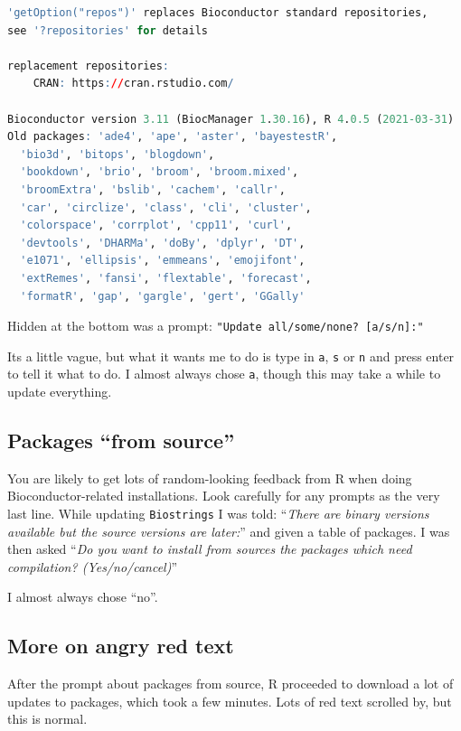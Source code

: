 \documentclass[
]{book}
\newcommand{\passthrough}[1]{#1}
\begin{document}
\begin{lstlisting}[language=R]
'getOption("repos")' replaces Bioconductor standard repositories, 
see '?repositories' for details

replacement repositories:
    CRAN: https://cran.rstudio.com/

Bioconductor version 3.11 (BiocManager 1.30.16), R 4.0.5 (2021-03-31)
Old packages: 'ade4', 'ape', 'aster', 'bayestestR', 
  'bio3d', 'bitops', 'blogdown',
  'bookdown', 'brio', 'broom', 'broom.mixed', 
  'broomExtra', 'bslib', 'cachem', 'callr',
  'car', 'circlize', 'class', 'cli', 'cluster', 
  'colorspace', 'corrplot', 'cpp11', 'curl',
  'devtools', 'DHARMa', 'doBy', 'dplyr', 'DT', 
  'e1071', 'ellipsis', 'emmeans', 'emojifont',
  'extRemes', 'fansi', 'flextable', 'forecast', 
  'formatR', 'gap', 'gargle', 'gert', 'GGally'
\end{lstlisting}

Hidden at the bottom was a prompt:
\passthrough{\lstinline!"Update all/some/none? [a/s/n]:"!}

Its a little vague, but what it wants me to do is type in \passthrough{\lstinline!a!}, \passthrough{\lstinline!s!} or \passthrough{\lstinline!n!} and press enter to tell it what to do. I almost always chose \passthrough{\lstinline!a!}, though this may take a while to update everything.

\hypertarget{packages-from-source}{%
\subsection{Packages ``from source''}\label{packages-from-source}}

You are likely to get lots of random-looking feedback from R when doing Bioconductor-related installations. Look carefully for any prompts as the very last line. While updating \passthrough{\lstinline!Biostrings!} I was told: ``\emph{There are binary versions available but the source versions are later:}'' and given a table of packages. I was then asked ``\emph{Do you want to install from sources the packages which need compilation? (Yes/no/cancel)}''

I almost always chose ``no''.

\hypertarget{more-on-angry-red-text}{%
\subsection{More on angry red text}\label{more-on-angry-red-text}}

After the prompt about packages from source, R proceeded to download a lot of updates to packages, which took a few minutes. Lots of red text scrolled by, but this is normal.
\end{document}
